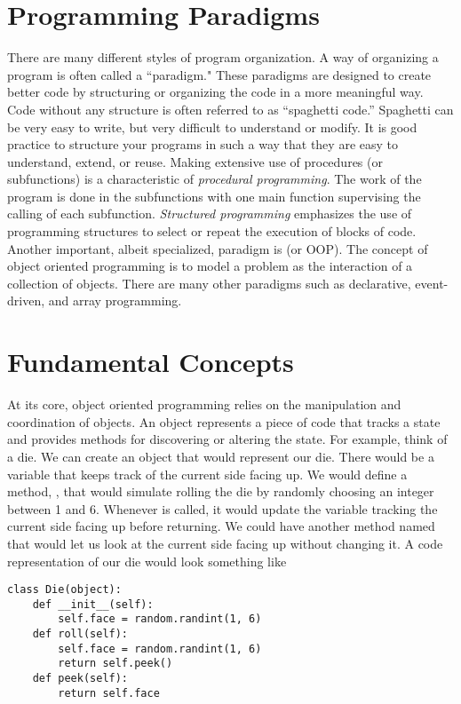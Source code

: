\label{lab:OOP}

\section*{Programming Paradigms}
There are many different styles of program organization.
A way of organizing a program is often called a ``paradigm."
These paradigms are designed to create better code by structuring or organizing the code in a more meaningful way.
Code without any structure is often referred to as ``spaghetti code.''
Spaghetti can be very easy to write, but very difficult to understand or modify.
It is good practice to structure your programs in such a way that they are easy to understand, extend, or reuse.
Making extensive use of procedures (or subfunctions) is a characteristic of \emph{procedural programming}.
The work of the program is done in the subfunctions with one main function supervising the calling of each subfunction.
\emph{Structured programming} emphasizes the use of programming structures to select or repeat the execution of blocks of code.
Another important, albeit specialized, paradigm is  (or OOP).
The concept of object oriented programming is to model a problem as the interaction of a collection of objects.
There are many other paradigms such as declarative, event-driven, and array programming.

\section*{Fundamental Concepts}
At its core, object oriented programming relies on the manipulation and coordination of objects.
An object represents a piece of code that tracks a state and provides methods for discovering or altering the state.
For example, think of a die.
We can create an object that would represent our die.
There would be a variable that keeps track of the current side facing up.
We would define a method, , that would simulate rolling the die by randomly choosing an integer between 1 and 6.
Whenever  is called, it would update the variable tracking the current side facing up before returning.
We could have another method named  that would let us look at the current side facing up without changing it.
A code representation of our die would look something like
\begin{lstlisting}
class Die(object):
    def __init__(self):
        self.face = random.randint(1, 6)
    def roll(self):
        self.face = random.randint(1, 6)
        return self.peek()
    def peek(self):
        return self.face
\end{lstlisting}


